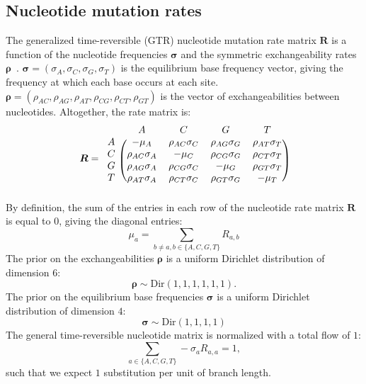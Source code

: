 \documentclass{article}
\newcommand{\UniDimArray}[1]{\bm{#1}}
\newcommand{\BiDimArray}[1]{\bm{#1}}
\newcommand{\mutmatrix}{R}
\newcommand{\Mutmatrix}{\BiDimArray{\mutmatrix}}
\newcommand{\exchan}{\rho}
\newcommand{\Exchan}{\UniDimArray{\exchan}}
\newcommand{\mutequi}{\sigma}
\newcommand{\Mutequi}{\UniDimArray{\mutequi}}
\begin{document}
    \subsection{Nucleotide mutation rates}
    \label{sec:nuc}
    The generalized time-reversible (GTR) nucleotide mutation rate matrix $\Mutmatrix$ is a function of the nucleotide frequencies $\Mutequi$ and the symmetric exchangeability rates $\Exchan$~\cite{tavare_probabilistic_1986}.
    $\Mutequi = (\mutequi_A , \mutequi_C , \mutequi_G , \mutequi_T)$ is the equilibrium base frequency vector, giving the frequency at which each base occurs at each site.
    $\Exchan = \left( \exchan_{AC}, \exchan_{AG}, \exchan_{AT}, \exchan_{CG}, \exchan_{CT}, \exchan_{GT}\right)$ is the vector of exchangeabilities between nucleotides.
    Altogether, the rate matrix is:
    \begin{equation}
        \label{eq:gtr-mutrates}
        \Mutmatrix =
        \begin{blockarray}{ccccc}
            & A & C & G & T \\
            \begin{block}{c(cccc)}
                A & -\mu_A & {\exchan_{AC}\mutequi_C} & {\exchan_{AG}\mutequi_G} & {\exchan_{AT}\mutequi_T} \\
                C & {\exchan_{AC}\mutequi_A} &                        -\mu_C & {\exchan_{CG}\mutequi_G} & {\exchan_{CT}\mutequi_T} \\
                G & {\exchan_{AG}\mutequi_A} & {\exchan_{CG}\mutequi_C} &                        -\mu_G & {\exchan_{GT}\mutequi_T} \\
                T & {\exchan_{AT}\mutequi_A} & {\exchan_{CT}\mutequi_C} & {\exchan_{GT}\mutequi_G} & -\mu_T\\
            \end{block}
        \end{blockarray}
    \end{equation}
    By definition, the sum of the entries in each row of the nucleotide rate matrix $\Mutmatrix$ is equal to $0$, giving the diagonal entries:
    \begin{equation}
        \mu_a = \sum\limits_{ b \neq a, b \in \{A, C, G, T\} } \mutmatrix_{a,b}
    \end{equation}
    The {prior} on the exchangeabilities $\Exchan$ is a uniform Dirichlet distribution of dimension $6$:
    \begin{equation}
        \label{eq:DistribExchan}
        \Exchan \sim \text{Dir}\left( 1,1,1,1,1,1 \right).
    \end{equation}
    The {prior} on the equilibrium base frequencies $\Mutequi$ is a uniform Dirichlet distribution of dimension $4$:
    \begin{equation}
        \label{eq:DistribMutequi}
        \Mutequi \sim \text{Dir}\left( 1,1,1,1 \right)
    \end{equation}
    The general time-reversible nucleotide matrix is normalized with a total flow of $1$:
    \begin{equation}
        \sum\limits_{a \in \{A, C, G, T\}} - \mutequi_a \mutmatrix_{a,a} = 1,
    \end{equation}
    such that we expect $1$ {substitution} per unit of branch length.
\end{document}
